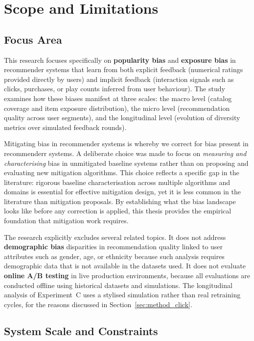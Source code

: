 \documentclass[11pt,a4paper]{report}
\begin{document}
\section{Scope and Limitations}

\subsection{Focus Area}

This research focuses specifically on \textbf{popularity bias} and \textbf{exposure bias} in recommender systems that learn from both explicit feedback (numerical ratings provided directly by users) and implicit feedback (interaction signals such as clicks, purchases, or play counts inferred from user behaviour). The study examines how these biases manifest at three scales: the macro level (catalog coverage and item exposure distribution), the micro level (recommendation quality across user segments), and the longitudinal level (evolution of diversity metrics over simulated feedback rounds).

Mitigating bias in recommender systems is whereby we correct for bias present in recommenderr systems. A deliberate choice was made to focus on \emph{measuring and characterising} bias in unmitigated baseline systems rather than on proposing and evaluating new mitigation algorithms. This choice reflects a specific gap in the literature: rigorous baseline characterisation across multiple algorithms and domains is essential for effective mitigation design, yet it is less common in the literature than mitigation proposals. By establishing what the bias landscape looks like before any correction is applied, this thesis provides the empirical foundation that mitigation work requires.

The research explicitly excludes several related topics. It does not address \textbf{demographic bias} disparities in recommendation quality linked to user attributes such as gender, age, or ethnicity because such analysis requires demographic data that is not available in the datasets used. It does not evaluate \textbf{online A/B testing} in live production environments, because all evaluations are conducted offline using historical datasets and simulations. The longitudinal analysis of Experiment~C uses a stylised simulation rather than real retraining cycles, for the reasons discussed in Section~\ref{sec:method_click}.

\subsection{System Scale and Constraints}
\end{document}
